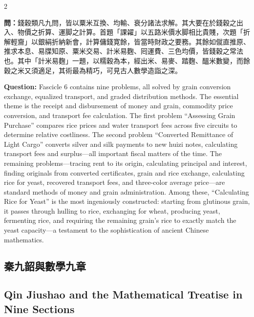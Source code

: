 \documentclass[11pt,a4paper]{article}
\newcommand{\QuestionText}[1]{\par\noindent\textbf{\color{problemcolor}問：}#1\par}
\newcommand{\QuestionEn}[1]{\par\noindent\textbf{\color{problemcolor}Question:} #1\par}
\begin{document}
\begin{paracol}{2}
\QuestionText{錢穀類凡九問，皆以粟米互換、均輸、衰分諸法求解。其大要在於錢穀之出入、物價之折算、運脚之計算。首題「課糴」以五路米價水脚相比貴賤，次題「折解輕齎」以銀絹折納新會，計算傭錢寛餘，皆當時財政之要務。其餘如僦直推原、推求本息、易牒知原、粟米交易、計米易麴、囘運費、三色均價，皆錢穀之常法也。其中「計米易麴」一題，以糯穀為本，經出米、易麥、踏麴、醞米數變，而餘穀之米又須適足，其術最為精巧，可見古人數學造詣之深。}
\switchcolumn
\QuestionEn{Fascicle 6 contains nine problems, all solved by grain conversion exchange, equalized transport, and graded distribution methods. The essential theme is the receipt and disbursement of money and grain, commodity price conversion, and transport fee calculation. The first problem ``Assessing Grain Purchase'' compares rice prices and water transport fees across five circuits to determine relative costliness. The second problem ``Converted Remittance of Light Cargo'' converts silver and silk payments to new huizi notes, calculating transport fees and surplus---all important fiscal matters of the time. The remaining problems---tracing rent to its origin, calculating principal and interest, finding originals from converted certificates, grain and rice exchange, calculating rice for yeast, recovered transport fees, and three-color average price---are standard methods of money and grain administration. Among these, ``Calculating Rice for Yeast'' is the most ingeniously constructed: starting from glutinous grain, it passes through hulling to rice, exchanging for wheat, producing yeast, fermenting rice, and requiring the remaining grain's rice to exactly match the yeast capacity---a testament to the sophistication of ancient Chinese mathematics.}
\switchcolumn*

\subsection*{秦九韶與數學九章}
\switchcolumn
\subsection*{Qin Jiushao and the Mathematical Treatise in Nine Sections}
\switchcolumn*


\end{paracol}
\end{document}
